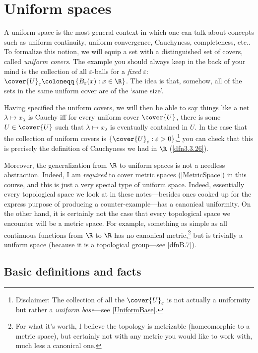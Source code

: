 \chapter{Uniform spaces}\label{chp5}

A uniform space is the most general context in which one can talk about concepts such as uniform continuity, uniform convergence, Cauchyness, completeness, etc..  To formalize this notion, we will equip a set with a distinguished set of covers, called \emph{uniform covers}.  The example you should always keep in the back of your mind is the collection of all $\varepsilon$-balls for a \emph{fixed} $\varepsilon$:  $\cover{U}_\varepsilon \coloneqq \left\{ B_\varepsilon (x):x\in \R \right\}$.  The idea is that, somehow, all of the sets in the same uniform cover are of the `same size'.

Having specified the uniform covers, we will then be able to say things like a net $\lambda \mapsto x_\lambda$ is Cauchy iff for every uniform cover $\cover{U}$, there is some $U\in \cover{U}$ such that $\lambda \mapsto x_\lambda$ is eventually contained in $U$.  In the case that the collection of uniform covers is $\left\{ \cover{U}_\varepsilon :\varepsilon >0\right\}$,\footnote{Disclaimer:  The collection of all the $\cover{U}_{\varepsilon}$ is not actually a uniformity but rather a \emph{uniform base}---see \cref{UniformBase}.} you can check that this is precisely the definition of Cauchyness we had in $\R$ (\cref{dfn3.3.26}).

Moreover, the generalization from $\R$ to uniform spaces is not a needless abstraction.  Indeed, I am \emph{required} to cover metric spaces (\cref{MetricSpace}) in this course, and this is just a very special type of uniform space.  Indeed, essentially every topological space we look at in these notes---besides ones cooked up for the express purpose of producing a counter-example---has a canonical uniformity.  On the other hand, it is certainly not the case that every topological space we encounter will be a metric space.  For example, something as simple as all continuous functions from $\R$ to $\R$ has no canonical metric,\footnote{For what it's worth, I believe the topology is metrizable (homeomorphic to a metric space), but certainly not with any metric you would like to work with, much less a canonical one.} but is trivially a uniform space (because it is a topological group---see \cref{dfnB.7}).

\section{Basic definitions and facts}

